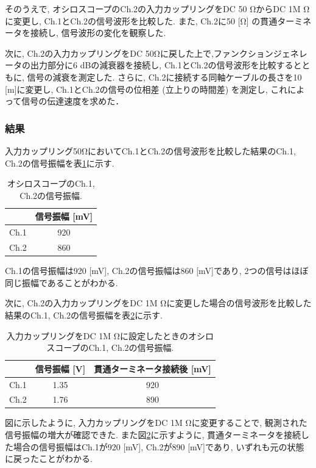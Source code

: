 \documentclass[uplatex,dvipdfmx,a4j,12pt]{jsarticle}
\begin{document}
そのうえで, オシロスコープのCh.2の入力カップリングをDC 50 \si{\ohm}からDC 1M \si{\ohm}に変更し, Ch.1とCh.2の信号波形を比較した.
また, Ch.2に50 [\si{\ohm}] の貫通ターミネータを接続し, 信号波形の変化を観察した.

次に, Ch.2の入力カップリングをDC 50\si{\ohm}に戻した上で,ファンクションジェネレータの出力部分に6 dBの減衰器を接続し, Ch.1とCh.2の信号波形を比較するとともに, 信号の減衰を測定した.
さらに, Ch.2に接続する同軸ケーブルの長さを10 [m]に変更し, Ch.1とCh.2の信号の位相差 (立上りの時間差) を測定し, これによって信号の伝達速度を求めた．



\subsubsection{結果}
入力カップリング50\si{\ohm}においてCh.1とCh.2の信号波形を比較した結果のCh.1, Ch.2の信号振幅を表\ref{table:1-1-1}に示す.
\begin{table}[h]
    \centering
    \caption{オシロスコープのCh.1, Ch.2の信号振幅.}
    \label{table:1-1-1}
    \begin{tabular}{cc}
        \hline
        & 信号振幅 [mV]\\
        \hline\hline
        Ch.1 & 920  \\
        Ch.2 & 860  \\
        \hline
    \end{tabular}
\end{table}
Ch.1の信号振幅は920 [mV], Ch.2の信号振幅は860 [mV]であり, 2つの信号はほぼ同じ振幅であることがわかる.

次に, Ch.2の入力カップリングをDC 1M \si{\ohm}に変更した場合の信号波形を比較した結果のCh.1, Ch.2の信号振幅を表\ref{table:-1-1-2}に示す.
\begin{table}[H]
    \centering
    \caption{入力カップリングをDC 1M \si{\ohm}に設定したときのオシロスコープのCh.1, Ch.2の信号振幅.}
    \label{table:-1-1-2}
    \begin{tabular}{ccc}
        \hline
        & 信号振幅 [V] & 貫通ターミネータ接続後 [mV]\\ %
        \hline\hline
        Ch.1 & 1.35 & 920 \\
        Ch.2 & 1.76 & 890\\
        \hline
    \end{tabular}
\end{table}
図に示したように, 入力カップリングをDC 1M \si{\ohm}に変更することで, 観測された信号振幅の増大が確認できた.
また図\ref{table:-1-1-2}に示すように, 貫通ターミネータを接続した場合の信号振幅はCh.1が920 [mV], Ch.2が890 [mV]であり, いずれも元の状態に戻ったことがわかる.
\end{document}
